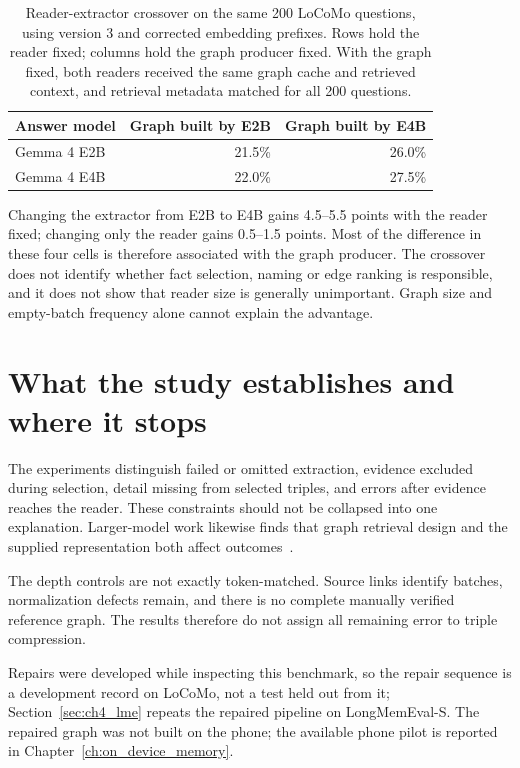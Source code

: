\begin{table}[htbp]
  \centering
  \small
  \begin{tabular}{lrr}
    \toprule
    Answer model & Graph built by E2B & Graph built by E4B \\
    \midrule
    Gemma 4 E2B & 21.5\% & 26.0\% \\
    Gemma 4 E4B & 22.0\% & 27.5\% \\
    \bottomrule
  \end{tabular}
  \caption{Reader-extractor crossover on the same 200 LoCoMo questions, using version 3
  and corrected embedding prefixes. Rows hold the reader fixed; columns hold the graph
  producer fixed. With the graph fixed, both readers received the same graph cache and
  retrieved context, and retrieval metadata matched for all 200 questions.}
  \label{tab:ch6_crossover}
\end{table}

Changing the extractor from E2B to E4B gains 4.5--5.5 points with the reader fixed;
changing only the reader gains 0.5--1.5 points. Most of the difference in these four
cells is therefore associated with the graph producer. The crossover does not identify
whether fact selection, naming or edge ranking is responsible, and it does not show
that reader size is generally unimportant. Graph size and empty-batch frequency alone
cannot explain the advantage.

\section{What the study establishes and where it stops}
\label{sec:ch6_limits}

The experiments distinguish failed or omitted extraction, evidence excluded during
selection, detail missing from selected triples, and errors after evidence reaches the
reader. These constraints should not be collapsed into one explanation. Larger-model
work likewise finds that graph retrieval design and the supplied representation both
affect outcomes~\citep{rag_vs_graphrag}.

The depth controls are not exactly token-matched. Source links identify batches,
normalization defects remain, and there is no complete manually verified reference graph.
The results therefore do not assign all remaining error to triple compression.

Repairs were developed while inspecting this benchmark, so the repair sequence is a
development record on LoCoMo, not a test held out from it; Section~\ref{sec:ch4_lme} repeats
the repaired pipeline on LongMemEval-S. The repaired graph was not
built on the phone; the available phone pilot is reported in
Chapter~\ref{ch:on_device_memory}.

